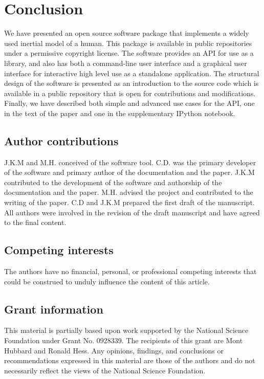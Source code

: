 \documentclass[10pt,a4paper,twocolumn]{article}
\begin{document}
\section*{Conclusion}
We have presented an open source software package that implements a widely used
inertial model of a human. This package is available in public repositories
under a permissive copyright license. The software provides an API for use as a
library, and also has both a command-line user interface and a graphical user
interface for interactive high level use as a standalone application. The
structural design of the software is presented as an introduction to the source
code which is available in a public repository that is open for contributions
and modifications. Finally, we have described both simple and advanced use
cases for the API, one in the text of the paper and one in the supplementary
IPython notebook.

\subsection*{Author contributions}
J.K.M and M.H. conceived of the software tool. C.D. was the primary developer
of the software and primary author of the documentation and the paper. J.K.M
contributed to the development of the software and authorship of the
documentation and the paper.  M.H. advised the project and contributed to the
writing of the paper. C.D and J.K.M prepared the first draft of the manuscript.
All authors were involved in the revision of the draft manuscript and have
agreed to the final content.

\subsection*{Competing interests}
The authors have no  financial, personal, or professional competing interests
that could be construed to unduly influence the content of this article.

\subsection*{Grant information}
This material is partially based upon work supported by the National Science
Foundation under Grant No. 0928339. The recipients of this grant are Mont
Hubbard and Ronald Hess. Any opinions, findings, and conclusions or
recommendations expressed in this material are those of the authors and do not
necessarily reflect the views of the National Science Foundation.
\end{document}
